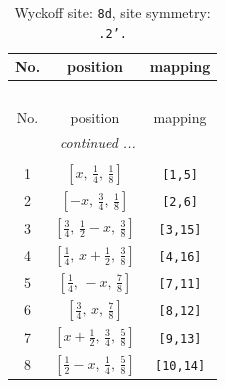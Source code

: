 \documentclass[fleqn,8pt]{jsarticle}
\begin{document}
\begin{longtable}{ccc}
\caption{Wyckoff site: {\tt 8d}, site symmetry: {\tt .2'.}}
 \\
 \hline \hline
No. & position & mapping \\ \hline \endfirsthead

\multicolumn{2}{l}{\tablename\ \thetable{}} \\
 \hline \hline
No. & position & mapping \\ \hline \endhead

 \hline \hline
\multicolumn{2}{r}{\footnotesize\it continued ...} \\ \endfoot

 \hline \hline
\multicolumn{2}{r}{} \\ \endlastfoot

1 & $\left[ x,\, \frac{1}{4},\, \frac{1}{8} \right]$ & {\tt [1,5]} \\ \hline
2 & $\left[ - x,\, \frac{3}{4},\, \frac{1}{8} \right]$ & {\tt [2,6]} \\ \hline
3 & $\left[ \frac{3}{4},\, \frac{1}{2} - x,\, \frac{3}{8} \right]$ & {\tt [3,15]} \\ \hline
4 & $\left[ \frac{1}{4},\, x + \frac{1}{2},\, \frac{3}{8} \right]$ & {\tt [4,16]} \\ \hline
5 & $\left[ \frac{1}{4},\, - x,\, \frac{7}{8} \right]$ & {\tt [7,11]} \\ \hline
6 & $\left[ \frac{3}{4},\, x,\, \frac{7}{8} \right]$ & {\tt [8,12]} \\ \hline
7 & $\left[ x + \frac{1}{2},\, \frac{3}{4},\, \frac{5}{8} \right]$ & {\tt [9,13]} \\ \hline
8 & $\left[ \frac{1}{2} - x,\, \frac{1}{4},\, \frac{5}{8} \right]$ & {\tt [10,14]} \\
\end{longtable}
\renewcommand{\arraystretch}{1.2}
\end{document}
